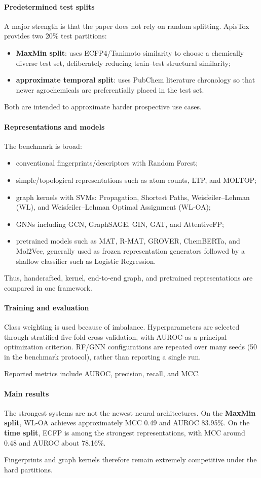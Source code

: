 \documentclass[11pt]{article}
\newcommand{\reviewfield}[2]{\paragraph{#1}#2}
\begin{document}
\reviewfield{Predetermined test splits}{
A major strength is that the paper does not rely on random splitting. ApisTox provides two 20\% test partitions:
\begin{itemize}
    \item \textbf{MaxMin split}: uses ECFP4/Tanimoto similarity to choose a chemically diverse test set, deliberately reducing train--test structural similarity;
    \item \textbf{approximate temporal split}: uses PubChem literature chronology so that newer agrochemicals are preferentially placed in the test set.
\end{itemize}
Both are intended to approximate harder prospective use cases.
}

\reviewfield{Representations and models}{
The benchmark is broad:
\begin{itemize}
    \item conventional fingerprints/descriptors with Random Forest;
    \item simple/topological representations such as atom counts, LTP, and MOLTOP;
    \item graph kernels with SVMs: Propagation, Shortest Paths, Weisfeiler--Lehman (WL), and Weisfeiler--Lehman Optimal Assignment (WL-OA);
    \item GNNs including GCN, GraphSAGE, GIN, GAT, and AttentiveFP;
    \item pretrained models such as MAT, R-MAT, GROVER, ChemBERTa, and Mol2Vec, generally used as frozen representation generators followed by a shallow classifier such as Logistic Regression.
\end{itemize}
Thus, handcrafted, kernel, end-to-end graph, and pretrained representations are compared in one framework.
}

\reviewfield{Training and evaluation}{
Class weighting is used because of imbalance. Hyperparameters are selected through stratified five-fold cross-validation, with AUROC as a principal optimization criterion. RF/GNN configurations are repeated over many seeds (50 in the benchmark protocol), rather than reporting a single run.

Reported metrics include AUROC, precision, recall, and MCC.
}

\reviewfield{Main results}{
The strongest systems are not the newest neural architectures. On the \textbf{MaxMin split}, WL-OA achieves approximately MCC 0.49 and AUROC 83.95\%. On the \textbf{time split}, ECFP is among the strongest representations, with MCC around 0.48 and AUROC about 78.16\%.

Fingerprints and graph kernels therefore remain extremely competitive under the hard partitions.
}
\end{document}
